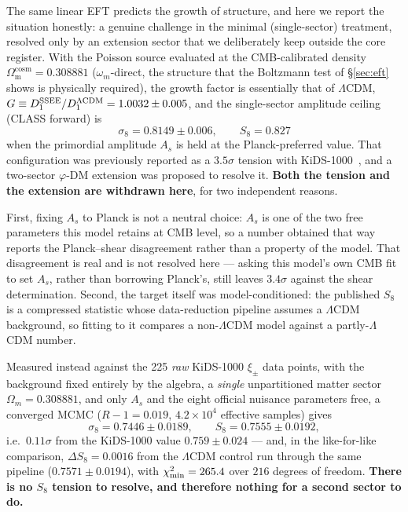 \documentclass[aps,prd,preprint,amsmath,amssymb,nofootinbib,longbibliography]{revtex4-2}
\newcommand{\Om}{\Omega_{\mathrm{m}}}
\begin{document}
The same linear EFT predicts the growth of structure, and here we report the
situation honestly: a genuine challenge in the minimal (single-sector)
treatment, resolved only by an extension sector that we deliberately keep
outside the core register. With the Poisson source evaluated at the
CMB-calibrated density $\Om^{\mathrm{cosm}}=0.308881$ ($\omega_m$-direct, the
structure that the Boltzmann test of \S\ref{sec:eft} shows is
physically required), the growth factor is essentially that of $\Lambda$CDM,
$G\equiv D_1^{\rm SSEE}/D_1^{\Lambda\rm CDM}=1.0032\pm0.005$, and the
single-sector amplitude ceiling (CLASS forward) is
\begin{equation}
  \label{eq:s8}
  \sigma_8=0.8149\pm0.006 , \qquad S_8=0.827
\end{equation}
when the primordial amplitude $A_s$ is held at the Planck-preferred value.
That configuration was previously reported as a $3.5\sigma$ tension with
KiDS-1000~\citep{KiDS2021,DESY32022}, and a two-sector $\varphi$-DM extension
was proposed to resolve it. \textbf{Both the tension and the extension are
withdrawn here}, for two independent reasons.

First, fixing $A_s$ to Planck is not a neutral choice: $A_s$ is one of the two
free parameters this model retains at CMB level, so a number obtained that way
reports the Planck--shear disagreement rather than a property of the model.
That disagreement is real and is not resolved here --- asking this model's own
CMB fit to set $A_s$, rather than borrowing Planck's, still leaves
$3.4\sigma$ against the shear determination. Second, the target itself was model-conditioned: the published $S_8$
is a compressed statistic whose data-reduction pipeline assumes a $\Lambda$CDM
background, so fitting to it compares a non-$\Lambda$CDM model against a
partly-$\Lambda$CDM number.

Measured instead against the 225 \emph{raw} KiDS-1000 $\xi_\pm$ data points,
with the background fixed entirely by the algebra, a \emph{single}
unpartitioned matter sector $\Omega_m=0.308881$, and only $A_s$ and the eight
official nuisance parameters free, a converged MCMC ($R-1=0.019$,
$4.2\times10^4$ effective samples) gives
\begin{equation}
  \sigma_8 = 0.7446\pm0.0189, \qquad S_8 = 0.7555\pm0.0192,
\end{equation}
i.e.\ $0.11\sigma$ from the KiDS-1000 value $0.759\pm0.024$ --- and, in the like-for-like comparison, $\Delta S_8=0.0016$ from the $\Lambda$CDM control run through the same pipeline ($0.7571\pm0.0194$), with
$\chi^2_{\rm min}=265.4$ over $216$ degrees of freedom. \textbf{There is no
$S_8$ tension to resolve, and therefore nothing for a second sector to do.}
\end{document}
